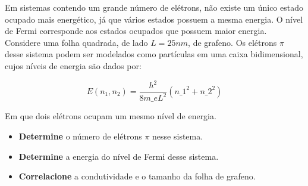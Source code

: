 Em sistemas contendo um grande número de elétrons, não existe um único
estado ocupado mais energético, já que vários estados possuem a mesma
energia. O nível de Fermi corresponde aos estados ocupados que possuem
maior energia. Considere uma folha quadrada, de lado \(L = 25 nm\), de
grafeno. Os elétrons \(\pi\) desse sistema podem ser modelados como
partículas em uma caixa bidimensional, cujos níveis de energia são dados
por:

\[ E(n_1, n_2) =
\dfrac{h^{2}}{8m\_{e}L^{2}}\left(n\_{1}^{2}+n\_{2}^{2}\right) \]

Em que dois elétrons ocupam um mesmo nível de energia.

\begin{itemize}

\item
  \textbf{Determine} o número de elétrons \(\pi\) nesse sistema.
\item
  \textbf{Determine} a energia do nível de Fermi desse sistema.
\item
  \textbf{Correlacione} a condutividade e o tamanho da folha de grafeno.
\end{itemize}
